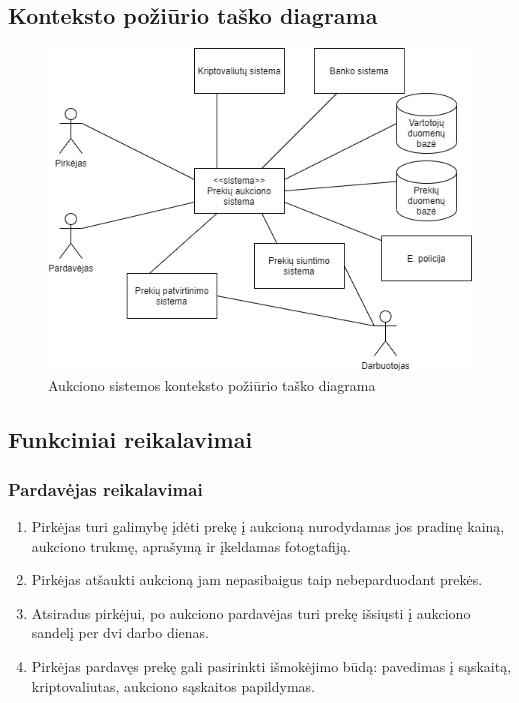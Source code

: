 \documentclass{VUMIFPSmagistrinis}
\begin{document}
			\subsection{Konteksto požiūrio taško diagrama}

				\begin{figure}[H]
				\centering
				\includegraphics[scale=0.9]{img/context}
				\caption{Aukciono sistemos konteksto požiūrio taško diagrama} %
				\label{img:text}
				\end{figure}
	
			\subsection{Funkciniai reikalavimai}
				\subsubsection{Pardavėjas reikalavimai}
					\begin{enumerate}
						\item{Pirkėjas turi galimybę įdėti prekę į aukcioną nurodydamas jos pradinę kainą, aukciono trukmę, aprašymą ir įkeldamas fotogtafiją.}
						\item{Pirkėjas atšaukti aukcioną jam nepasibaigus taip nebeparduodant prekės.}
						\item{Atsiradus pirkėjui, po aukciono pardavėjas turi prekę išsiųsti į aukciono sandelį per dvi darbo dienas.}
						\item{Pirkėjas pardavęs prekę gali pasirinkti išmokėjimo būdą: pavedimas į sąskaitą, kriptovaliutas, aukciono sąskaitos papildymas.}
					\end{enumerate}
\end{document}
